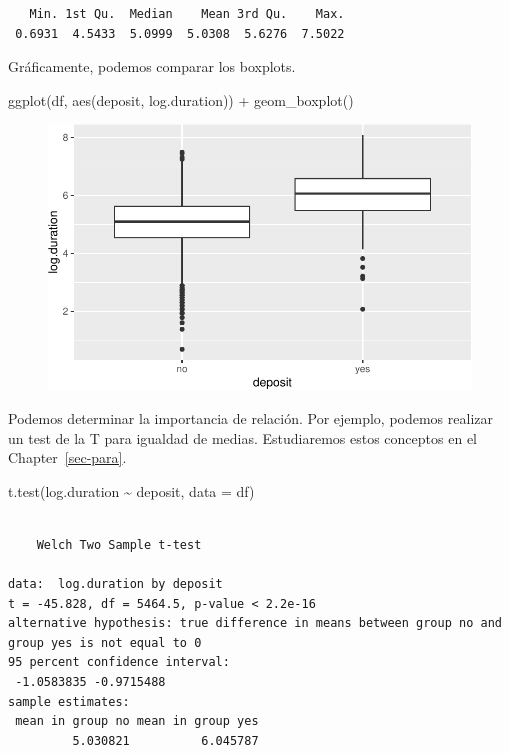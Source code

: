 \documentclass[
  letterpaper,
  DIV=11,
  numbers=noendperiod]{scrreprt}
\newenvironment{Shaded}{\begin{snugshade}}{\end{snugshade}}
\newcommand{\AttributeTok}[1]{\textcolor[rgb]{0.40,0.45,0.13}{#1}}
\newcommand{\FunctionTok}[1]{\textcolor[rgb]{0.28,0.35,0.67}{#1}}
\newcommand{\NormalTok}[1]{\textcolor[rgb]{0.00,0.23,0.31}{#1}}
\newcommand{\SpecialCharTok}[1]{\textcolor[rgb]{0.37,0.37,0.37}{#1}}
\begin{document}
\begin{verbatim}
   Min. 1st Qu.  Median    Mean 3rd Qu.    Max. 
 0.6931  4.5433  5.0999  5.0308  5.6276  7.5022 
\end{verbatim}

Gráficamente, podemos comparar los boxplots.

\begin{Shaded}
\begin{Highlighting}[]
\FunctionTok{ggplot}\NormalTok{(df, }\FunctionTok{aes}\NormalTok{(deposit, log.duration)) }\SpecialCharTok{+}
        \FunctionTok{geom\_boxplot}\NormalTok{()}
\end{Highlighting}
\end{Shaded}

\begin{figure}[H]

{\centering \includegraphics{eda_files/figure-pdf/unnamed-chunk-25-1.pdf}

}

\end{figure}

Podemos determinar la importancia de relación. Por ejemplo, podemos
realizar un test de la T para igualdad de medias. Estudiaremos estos
conceptos en el Chapter~\ref{sec-para}.

\begin{Shaded}
\begin{Highlighting}[]
\FunctionTok{t.test}\NormalTok{(log.duration }\SpecialCharTok{\textasciitilde{}}\NormalTok{ deposit, }\AttributeTok{data =}\NormalTok{ df)}
\end{Highlighting}
\end{Shaded}

\begin{verbatim}

    Welch Two Sample t-test

data:  log.duration by deposit
t = -45.828, df = 5464.5, p-value < 2.2e-16
alternative hypothesis: true difference in means between group no and group yes is not equal to 0
95 percent confidence interval:
 -1.0583835 -0.9715488
sample estimates:
 mean in group no mean in group yes 
         5.030821          6.045787 
\end{verbatim}
\end{document}
